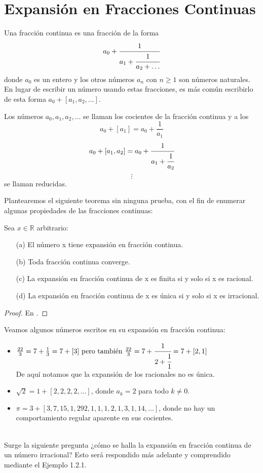 \section{Expansión en Fracciones Continuas}
\begin{defi}
Una fracción continua es una fracción de la forma
$$
a_{0}+\cfrac{1}{a_{1} + \cfrac{1}{a_{2} + \ldots}}
$$
donde $a_{0}$ es un entero y los otros números $a_{n}$ con $n\geq1$ son números naturales.
\\

En lugar de escribir un número usando estas fracciones, es más común escribirlo de esta forma $a_{0}+[a_{1}, a_{2}, \ldots]$.

Los números $a_{0},a_{1},a_{2},\ldots$ se llaman los cocientes de la fracción continua y a los 
$$a_{0}+[a_{1}]=a_{0}+\frac{1}{a_{1}}$$
$$a_{0}+[a_{1},a_{2}]=a_{0}+\cfrac{1}{a_{1}+\cfrac{1}{a_{2}}}
$$
$$
\vdots
$$
se llaman reducidas.
\end{defi}

Plantearemos el siguiente teorema sin ninguna prueba, con el fin de enumerar algunas propiedades de las fracciones continuas:

\begin{teo}
Sea $x\in\mathbb{R}$ arbitrario:
\begin{itemize}
    \item[(a)] El número x tiene expansión en fracción continua.
    \item[(b)] Toda fracción continua converge.
    \item[(c)] La expansión en fracción continua de x es finita si y solo si x es racional.
    \item[(d)] La expansión en fracción continua de x es única si y solo si x es irracional.
\end{itemize}
\end{teo}
\begin{proof}
En \cite{Portugues}.
\end{proof}
\begin{ejem}
Veamos algunos números escritos en su expansión en fracción continua:
\begin{itemize}
    \item $\frac{22}{3}= 7 + \frac{1}{3} = 7+[3] \text{ pero también }\frac{22}{3}= 7 + \cfrac{1}{2 + \cfrac{1}{1}} = 7+[2,1]$
    \\
    
    De aquí notamos que la expansión de los racionales no es única.
    \item $\sqrt{2}=1+[2,2,2,2,\ldots]$, donde $a_{k}=2$ para todo $k\neq0$.
    \item $\pi=3+[3,7,15,1,292,1,1,1,2,1,3,1,14,\ldots]$, donde no hay un comportamiento regular aparente en sus cocientes.
\end{itemize}
\end{ejem}
\\
Surge la siguiente pregunta ¿cómo se halla la expansión en fracción continua de un número irracional? Esto será respondido más adelante y comprendido mediante el Ejemplo 1.2.1.

